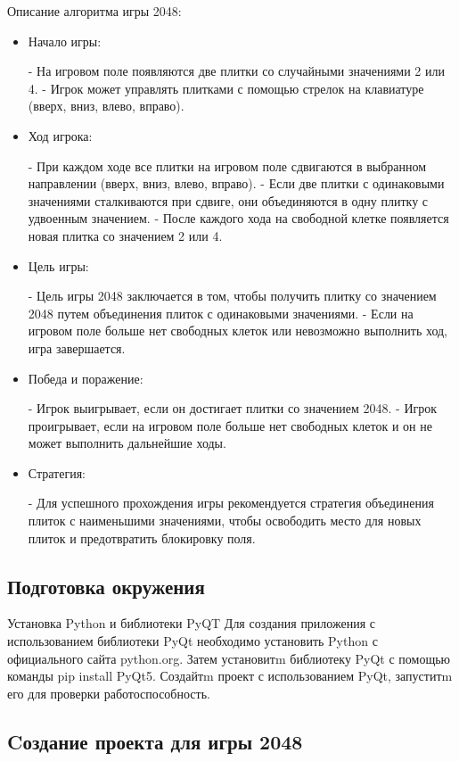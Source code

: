 Описание алгоритма игры 2048:
\begin{itemize}
\item Начало игры:

   - На игровом поле появляются две плитки со случайными значениями 2 или 4.
   - Игрок может управлять плитками с помощью стрелок на клавиатуре (вверх, вниз, влево, вправо).
\item Ход игрока:

   - При каждом ходе все плитки на игровом поле сдвигаются в выбранном направлении (вверх, вниз, влево, вправо).
   - Если две плитки с одинаковыми значениями сталкиваются при сдвиге, они объединяются в одну плитку с удвоенным значением.
   - После каждого хода на свободной клетке появляется новая плитка со значением 2 или 4.
\item  Цель игры:

   - Цель игры 2048 заключается в том, чтобы получить плитку со значением 2048 путем объединения плиток с одинаковыми значениями.
   - Если на игровом поле больше нет свободных клеток или невозможно выполнить ход, игра завершается.
\item Победа и поражение:

   - Игрок выигрывает, если он достигает плитки со значением 2048.
   - Игрок проигрывает, если на игровом поле больше нет свободных клеток и он не может выполнить дальнейшие ходы.
\item Стратегия:

   - Для успешного прохождения игры рекомендуется стратегия объединения плиток с наименьшими значениями, чтобы освободить место для новых плиток и предотвратить блокировку поля.
\end{itemize}
\subsection{\label{subsec:ch01/sec01/sub02}Подготовка окружения}
Установка Python и библиотеки PyQT
Для создания приложения с использованием библиотеки PyQt  необходимо установить Python с официального сайта python.org. Затем установитm библиотеку PyQt с помощью команды pip install PyQt5. Создайтm проект с использованием PyQt, запуститm его для проверки работоспособность.

\subsection{\label{subsec:ch01/sec01/sub02}Cоздание проекта для игры 2048}

